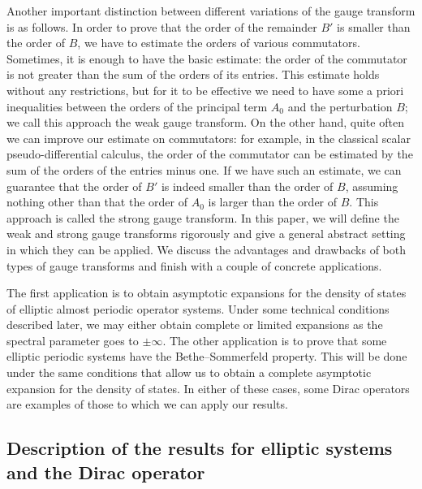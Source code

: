 \documentclass[10pt]{amsart}
\theoremstyle{definition}\newtheorem{defi}[theo]{Definition}\newtheorem{rema}[theo]{Remark}\newtheorem{exam}[theo]{Example}\newtheorem{nota}[theo]{Notation}
\begin{document}
Another important distinction between different variations of the gauge transform is as follows. In order to prove that the order of the remainder $B'$ is smaller than the order of $B$, we have to estimate the orders of various commutators. Sometimes, it is enough to have the basic estimate: the order of the commutator is not greater than the sum of the orders of its entries. This estimate holds without any restrictions, but for it to be effective we need to have some a priori inequalities between the orders of the principal term $A_0$ and the perturbation $B$; we call this approach the weak gauge transform. On the other hand, quite often we can improve our estimate on commutators: for example, in the classical scalar pseudo-differential calculus, the order of the commutator can be estimated by the sum of the orders of the entries minus one. If we have such an estimate, we can guarantee that the order of $B'$ is indeed smaller than the order of $B$, assuming nothing other than that the order of $A_0$ is larger than the order of $B$. This approach is called the strong gauge transform. In this paper, we will define the weak and strong gauge transforms rigorously and give a general abstract setting in which they can be applied. We discuss the advantages and drawbacks of both types of gauge transforms and finish with a couple of concrete applications.

The first application is to obtain asymptotic expansions for the density of states of elliptic almost periodic operator systems. Under some technical conditions described later, we may either obtain complete or limited expansions as the spectral parameter goes to $\pm\infty$. The other application is to prove that some elliptic periodic systems have the Bethe--Sommerfeld property. This will be done under the same conditions that allow us to obtain a complete asymptotic expansion for the density of states. In either of these cases, some Dirac operators are examples of those to which we can apply our results.

\subsection{Description of the results for elliptic systems and the Dirac operator}
\end{document}
